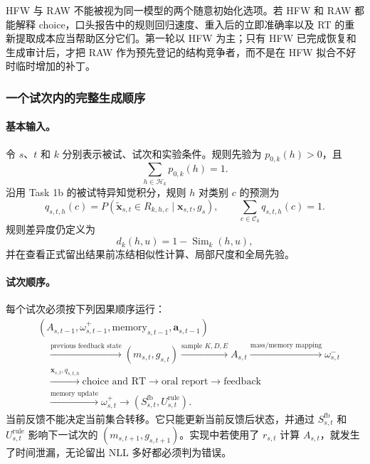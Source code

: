 HFW 与 RAW 不能被视为同一模型的两个随意初始化选项。若 HFW 和 RAW 都能解释 choice，口头报告中的规则回归速度、重入后的立即准确率以及 RT 的重新提取成本应当帮助区分它们。第一轮以 HFW 为主；只有 HFW 已完成恢复和生成审计后，才把 RAW 作为预先登记的结构竞争者，而不是在 HFW 拟合不好时临时增加的补丁。


\subsubsection{一个试次内的完整生成顺序}

\paragraph{基本输入。}
令 $s$、$t$ 和 $k$ 分别表示被试、试次和实验条件。规则先验为 $p_{0,k}(h)>0$，且
\begin{equation}
    \sum_{h\in\mathcal H_k}p_{0,k}(h)=1.
    \label{eq:model0804-rule-prior}
\end{equation}
沿用 Task 1b 的被试特异知觉积分，规则 $h$ 对类别 $c$ 的预测为
\begin{equation}
    q_{s,t,h}(c)
    =P\!\left(
      \widetilde{\mathbf x}_{s,t}\in R_{k,h,c}
      \mid \mathbf x_{s,t},g_s
    \right),
    \qquad
    \sum_{c\in\mathcal C_k}q_{s,t,h}(c)=1.
    \label{eq:model0804-rule-prediction}
\end{equation}
规则差异度仍定义为
\begin{equation}
    d_k(h,u)=1-\operatorname{Sim}_k(h,u),
    \label{eq:model0804-rule-distance}
\end{equation}
并在查看正式留出结果前冻结相似性计算、局部尺度和全局先验。

\paragraph{试次顺序。}
每个试次必须按下列因果顺序运行：
\begin{equation}
\begin{aligned}
&(A_{s,t-1},\omega^+_{s,t-1},\text{memory}_{s,t-1},
  \mathbf a_{s,t-1})\\
&\quad\xrightarrow{\text{previous feedback state}}
  (m_{s,t},g_{s,t})
\xrightarrow{\text{sample }K,D,E}
  A_{s,t}
\xrightarrow{\text{mass/memory mapping}}
  \omega^-_{s,t}\\
&\quad\xrightarrow{\mathbf x_{s,t},q_{s,t,h}}
  \text{choice and RT}
\longrightarrow \text{oral report}
\longrightarrow \text{feedback}\\
&\quad\xrightarrow{\text{memory update}}
  \omega^+_{s,t}
\longrightarrow
  (S^{\mathrm{fb}}_{s,t},U^{\mathrm{rule}}_{s,t}).
\end{aligned}
\label{eq:model0804-trial-order}
\end{equation}
当前反馈不能决定当前集合转移。它只能更新当前反馈后状态，并通过 $S^{\mathrm{fb}}_{s,t}$ 和 $U^{\mathrm{rule}}_{s,t}$ 影响下一试次的 $(m_{s,t+1},g_{s,t+1})$。实现中若使用了 $r_{s,t}$ 计算 $A_{s,t}$，就发生了时间泄漏，无论留出 NLL 多好都必须判为错误。

